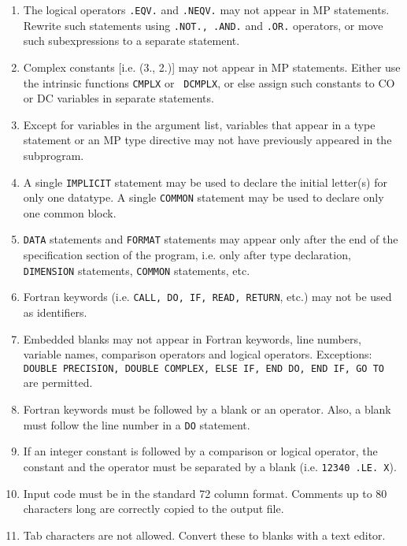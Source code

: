 \begin{enumerate}
\item The logical operators {\tt .EQV.} and {\tt .NEQV.} may not
appear in MP statements.  Rewrite such statements using {\tt .NOT.,
.AND.} and {\tt .OR.} operators, or move such subexpressions to a
separate statement.
 
\item Complex constants [i.e. (3., 2.)] may not appear in MP
statements.  Either use the intrinsic functions {\tt CMPLX} or {\tt
DCMPLX}, or else assign such constants to CO or DC variables in
separate statements.
 
\item Except for variables in the argument list, variables that appear
in a type statement or an MP type directive may not have previously
appeared in the subprogram.

\item A single {\tt IMPLICIT} statement may be used to declare the
initial letter(s) for only one datatype.  A single {\tt COMMON}
statement may be used to declare only one common block.
 
\item {\tt DATA} statements and {\tt FORMAT} statements may appear
only after the end of the specification section of the program, i.e.
only after type declaration, {\tt DIMENSION} statements, {\tt COMMON}
statements, etc.
 
\item Fortran keywords (i.e. {\tt CALL, DO, IF, READ, RETURN}, etc.)
may not be used as identifiers.

\item Embedded blanks may not appear in Fortran keywords, line numbers,
variable names, comparison operators and logical operators.
Exceptions: {\tt DOUBLE PRECISION, DOUBLE COMPLEX, ELSE IF, END DO,
END IF, GO TO} are permitted.

\item Fortran keywords must be followed by a blank or an operator.
Also, a blank must follow the line number in a {\tt DO} statement.

\item If an integer constant is followed by a comparison or logical
operator, the constant and the operator must be separated by a blank
(i.e. {\tt 12340 .LE. X}).

\item Input code must be in the standard 72 column format.  Comments
up to 80 characters long are correctly copied to the output file.

\item Tab characters are not allowed.  Convert these to blanks with
a text editor.
 
\end{enumerate}

